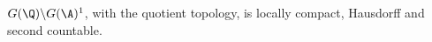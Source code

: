 $G(\Q)\backslash G(\A)^1$, with the quotient topology, is locally compact, Hausdorff and second countable.
